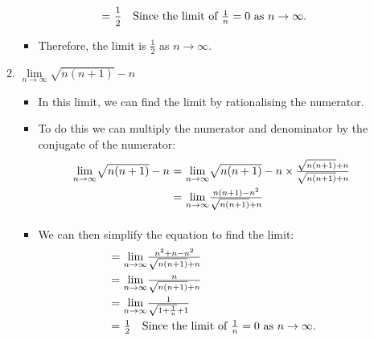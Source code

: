 \documentclass[12pt]{report}
\begin{document}
\begin{enumerate}[leftmargin=\labelsep]
\begin{enumerate}
\begin{tcolorbox}
\begin{equation*}
\begin{array}{r@{~=~}l}
                            & \mfrac{1}{2} \quad \text{Since the limit of } \frac{1}{n} = 0 \text{ as } n \rightarrow \infty.
                        \end{array}
                    \end{equation*}
                    \begin{itemize}[label={}]
                        \item Therefore, the limit is $\frac{1}{2}$ as $n \rightarrow \infty$.
                    \end{itemize}
                \end{tcolorbox}
            \item $\lim \limits_{n\rightarrow \infty} \sqrt{n(n+1)}-n$
                \begin{tcolorbox}
                    \begin{itemize}[label={}]
                        \item In this limit, we can find the limit by rationalising the numerator.
                        \item To do this we can multiply the numerator and denominator by the conjugate of the numerator:
                        \begin{equation*}
                            \begin{array}{r@{~=~}l}
                                {\lim \limits_{{n\rightarrow \infty}}} \sqrt{n(n+1)}-n & {\lim \limits_{{n\rightarrow \infty}}} \sqrt{n(n+1)}-n \times \frac{\sqrt{n(n+1)}+n}{\sqrt{n(n+1)}+n} \\ [2ex]
                                & {\lim \limits_{{n\rightarrow \infty}}} \frac{n(n+1)-n^2}{\sqrt{n(n+1)}+n} \\ [2ex]
                            \end{array}
                        \end{equation*}
                        \item We can then simplify the equation to find the limit:
                        \begin{equation*}
                            \begin{array}{r@{~=~}l}
                                & {\lim \limits_{{n\rightarrow \infty}}} \frac{n^2+n-n^2}{\sqrt{n(n+1)}+n} \\ [2ex]
                                & {\lim \limits_{{n\rightarrow \infty}}} \frac{n}{\sqrt{n(n+1)}+n} \\ [2ex]
                                & {\lim \limits_{{n\rightarrow \infty}}} \frac{1}{\sqrt{1+\frac{1}{n}}+1} \\ [2ex]
                                & \frac{1}{2} \quad \text{Since the limit of } \frac{1}{n} = 0 \text{ as } n \rightarrow \infty.
                            \end{array}
                        \end{equation*}
                    \end{itemize}
                \end{tcolorbox}
        \end{enumerate}


\end{enumerate}
\end{document}
